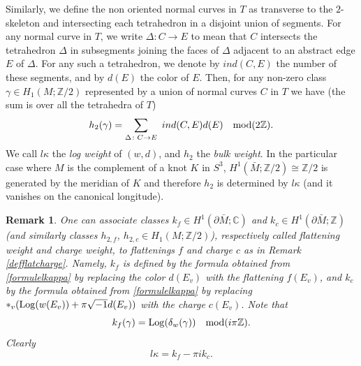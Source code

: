 \documentclass[11pt]{amsart}
\newtheorem{remark}[teo]{Remark}
\newcommand{\mc}{\mathbb{C}}
\newcommand{\mz}{\mathbb{Z}}
\newcommand{\Log}{{\rm Log}}
\newcommand{\ra}{\rightarrow}
\begin{document}
Similarly, we define the non oriented normal curves in $T$ as transverse to the $2$-skeleton and intersecting each tetrahedron in a disjoint union of segments. For any normal curve in $T$, we write $\Delta\colon C \rightarrow E$ to mean that $C$ intersects the tetrahedron $\Delta$ in subsegments joining the faces of $\Delta$ adjacent to an abstract edge $E$ of $\Delta$. For any such a tetrahedron, we denote by $ind(C,E)$ the number of these segments, and by $d(E)$ the color of $E$. Then, for any non-zero class $\gamma \in H_1(M;\mz/2)$ represented by a union of normal curves $C$ in $T$ we have (the sum is over all the tetrahedra of $T$)
  \begin{equation}
  h_2(\gamma) =\sum_{\Delta\colon C \ra E} \ ind(C,E)d(E) \quad{\rm mod} (2\mz). \label{formulebulkw}
\end{equation}
We call $l\kappa$ the {\it log weight} of $(w,d)$, and $h_2$ the {\it bulk weight}. In the particular case where $M$ is the complement of a knot $K$ in $S^3$, $H^1(\bar M; \mz/2)\cong \mz/2$ is generated by the meridian of $K$ and therefore $h_2$ is determined by $l\kappa$ (and it vanishes on the canonical longitude).
\begin{remark}\label{cfweight}{\rm One can associate classes $k_f\in H^1(\partial\bar{M};\mc)$ and $k_c\in H^1(\partial\bar{M};\mz)$ (and similarly classes $h_{2,f}$, $h_{2,c} \in H_1(M;\mz/2)$), respectively called {\it flattening weight} and {\it charge weight}, to flattenings $f$ and charge $c$ as in Remark \ref{defflatcharge}. Namely, $k_f$ is defined by the formula obtained from \eqref{formulelkappa} by replacing the color $d(E_v)$ with the flattening $f(E_v)$, and $k_c$ by the formula obtained from \eqref{formulelkappa} by replacing $*_v(\Log(w(E_v))+\pi \sqrt{-1}d(E_v))$ with the charge $c(E_v)$. Note that
\begin{equation}\label{fconstraint0}
k_f(\gamma)  = \Log(\delta_{w}(\gamma)) \quad {\rm mod}(i\pi\mz).
\end{equation}
Clearly
\begin{equation}\label{deflkappa}
	l\kappa= k_f-\pi ik_c.
\end{equation}
}\end{remark}
\end{document}

